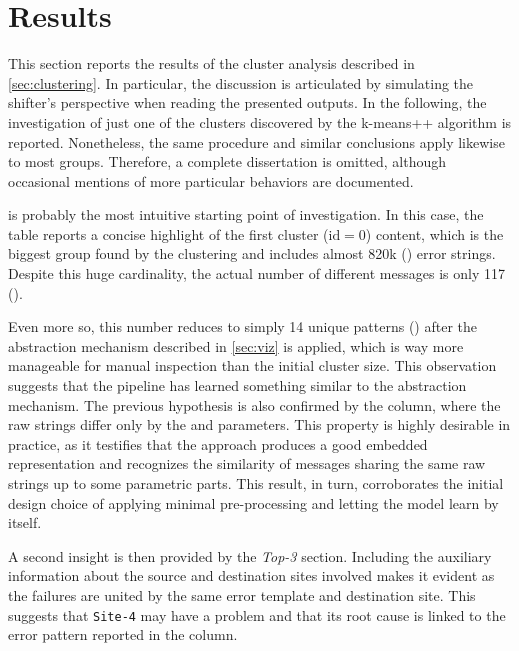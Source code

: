 \chapter{Results} 
\label{ch:opint-results}

This section reports the results of the cluster analysis described in \cref{sec:clustering}. 
In particular, the discussion is articulated by simulating the shifter's perspective when reading the presented outputs.
In the following, the investigation of just one of the clusters discovered by the k-means++ algorithm is reported.
Nonetheless, the same procedure and similar conclusions apply likewise to most groups.
Therefore, a complete dissertation is omitted, although occasional mentions of more particular behaviors are documented.

 is probably the most intuitive starting point of investigation.
In this case, the table reports a concise highlight of the first cluster ($\text{id}=0$) content, which is the biggest group found by the clustering and includes almost 820k () error strings.
Despite this huge cardinality, the actual number of different messages is only 117 ().

Even more so, this number reduces to simply 14 unique patterns () after the abstraction mechanism described in \cref{sec:viz} is applied, which is way more manageable for manual inspection than the initial cluster size.
This observation suggests that the pipeline has learned something similar to the abstraction mechanism.
The previous hypothesis is also confirmed by the  column, where the raw strings differ only by the  and  parameters.
This property is highly desirable in practice, as it testifies that the approach produces a good embedded representation and recognizes the similarity of messages sharing the same raw strings up to some parametric parts. 
This result, in turn, corroborates the initial design choice of applying minimal pre-processing and letting the model learn by itself.

A second insight is then provided by the \textit{Top-3} section. 
Including the auxiliary information about the source and destination sites involved makes it evident as the failures are united by the same error template and destination site.
This suggests that \texttt{Site-4} may have a problem and that its root cause is linked to the error pattern reported in the  column. 

